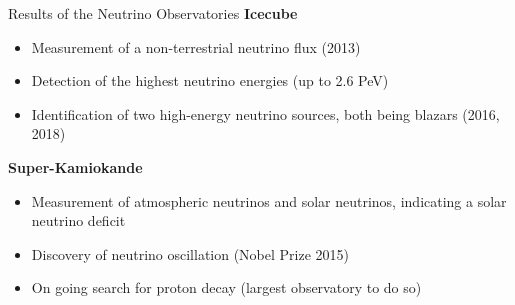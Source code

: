 \documentclass[aspectratio=1610, 10pt]{beamer}
\begin{document}
\begin{frame}{Results of the Neutrino Observatories}
\textbf{Icecube}
 \begin{itemize}
   \item Measurement of a non-terrestrial neutrino flux (2013)
   \medskip
   \item Detection of the highest neutrino energies (up to 2.6 PeV)
   \medskip
   \item Identification of two high-energy neutrino sources, both being blazars (2016, 2018)
 \end{itemize}
\vspace{0.5cm}
\textbf{Super-Kamiokande}
  \begin{itemize}
    \item Measurement of atmospheric neutrinos and solar neutrinos, indicating a solar neutrino deficit
    \medskip
    \item Discovery of neutrino oscillation (Nobel Prize 2015)
    \medskip
    \item On going search for proton decay (largest observatory to do so)
  \end{itemize}
\end{frame}
\end{document}
